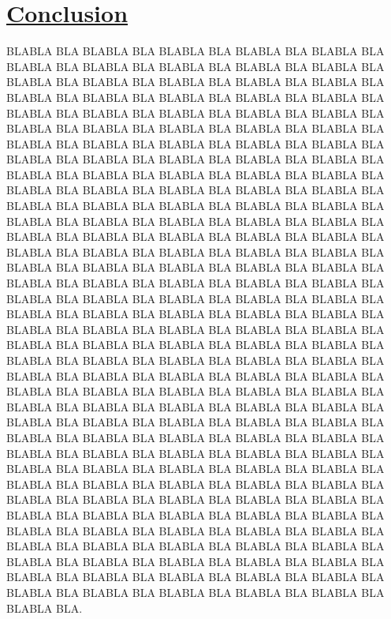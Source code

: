 \documentclass[a4paper, 12pt]{article}
\begin{document}
\newpage \section*{\underline{Conclusion}}  

\begin{doublespace}
BLABLA BLA BLABLA BLA BLABLA BLA BLABLA BLA BLABLA BLA BLABLA BLA BLABLA BLA BLABLA BLA BLABLA BLA BLABLA BLA BLABLA BLA BLABLA BLA BLABLA BLA BLABLA BLA BLABLA BLA BLABLA BLA BLABLA BLA BLABLA BLA BLABLA BLA BLABLA BLA BLABLA BLA BLABLA BLA BLABLA BLA BLABLA BLA BLABLA BLA BLABLA BLA BLABLA BLA BLABLA BLA BLABLA BLA BLABLA BLA BLABLA BLA BLABLA BLA BLABLA BLA BLABLA BLA BLABLA BLA BLABLA BLA BLABLA BLA BLABLA BLA BLABLA BLA BLABLA BLA BLABLA BLA BLABLA BLA BLABLA BLA BLABLA BLA BLABLA BLA BLABLA BLA BLABLA BLA BLABLA BLA BLABLA BLA BLABLA BLA BLABLA BLA BLABLA BLA BLABLA BLA BLABLA BLA BLABLA BLA BLABLA BLA BLABLA BLA BLABLA BLA BLABLA BLA BLABLA BLA BLABLA BLA BLABLA BLA BLABLA BLA BLABLA BLA BLABLA BLA BLABLA BLA BLABLA BLA BLABLA BLA BLABLA BLA BLABLA BLA BLABLA BLA BLABLA BLA BLABLA BLA BLABLA BLA BLABLA BLA BLABLA BLA BLABLA BLA BLABLA BLA BLABLA BLA BLABLA BLA BLABLA BLA BLABLA BLA BLABLA BLA BLABLA BLA BLABLA BLA BLABLA BLA BLABLA BLA BLABLA BLA BLABLA BLA BLABLA BLA BLABLA BLA BLABLA BLA BLABLA BLA BLABLA BLA BLABLA BLA BLABLA BLA BLABLA BLA BLABLA BLA BLABLA BLA BLABLA BLA BLABLA BLA BLABLA BLA BLABLA BLA BLABLA BLA BLABLA BLA BLABLA BLA BLABLA BLA BLABLA BLA BLABLA BLA BLABLA BLA BLABLA BLA BLABLA BLA BLABLA BLA BLABLA BLA BLABLA BLA BLABLA BLA BLABLA BLA BLABLA BLA BLABLA BLA BLABLA BLA BLABLA BLA BLABLA BLA BLABLA BLA BLABLA BLA BLABLA BLA BLABLA BLA BLABLA BLA BLABLA BLA BLABLA BLA BLABLA BLA BLABLA BLA BLABLA BLA BLABLA BLA BLABLA BLA BLABLA BLA BLABLA BLA BLABLA BLA BLABLA BLA BLABLA BLA BLABLA BLA BLABLA BLA BLABLA BLA BLABLA BLA BLABLA BLA BLABLA BLA BLABLA BLA BLABLA BLA BLABLA BLA BLABLA BLA BLABLA BLA BLABLA BLA BLABLA BLA BLABLA BLA BLABLA BLA BLABLA BLA BLABLA BLA BLABLA BLA BLABLA BLA BLABLA BLA BLABLA BLA BLABLA BLA BLABLA BLA BLABLA BLA BLABLA BLA BLABLA BLA BLABLA BLA BLABLA BLA BLABLA BLA BLABLA BLA BLABLA BLA BLABLA BLA BLABLA BLA BLABLA BLA BLABLA BLA BLABLA BLA BLABLA BLA BLABLA BLA BLABLA BLA BLABLA BLA BLABLA BLA BLABLA BLA.
\end{doublespace}
\end{document}
